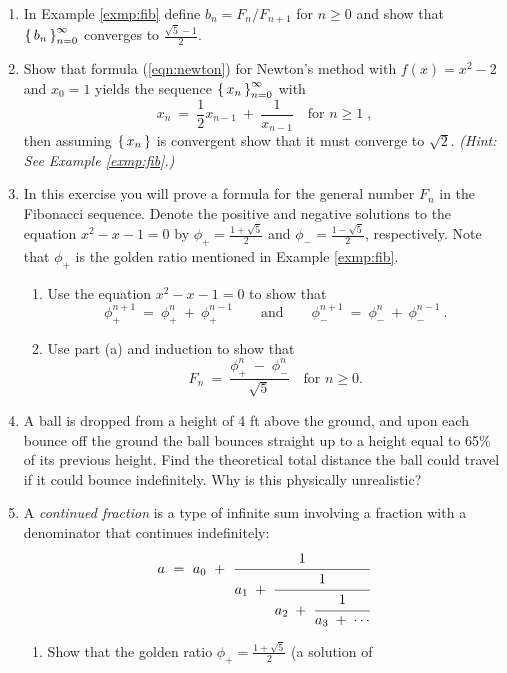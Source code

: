 {\begin{enumerate}[\bfseries 1.]
[{[\bfseries 1.]}]
 \item In Example \ref{exmp:fib} define $b_n = F_n/F_{n+1}$ for $n\ge 0$ and
 show that $\left\lbrace\mspace{3mu}b_n\mspace{3mu}\right\rbrace_{n=0}^{\infty}$ converges to $\frac{\sqrt{5}-1}{2}$.
 \item Show that formula (\ref{eqn:newton}) for Newton's method with
 $f(x) = x^2 - 2$ and $x_0 = 1$ yields the sequence $\left\lbrace\mspace{3mu}x_n\mspace{3mu}\right\rbrace_{n=0}^{\infty}$
 with
\[
x_n ~=~ \frac{1}{2} x_{n-1} ~+~ \frac{1}{x_{n-1}} \quad\text{for $n\ge 1\;$,}
\]
then assuming $\left\lbrace\mspace{3mu}x_n\mspace{3mu}\right\rbrace$ is convergent show that it must converge to
$\sqrt{2}$. \emph{(Hint: See Example \ref{exmp:fib}.)}
 \item In this exercise you will prove a formula for the general number $F_n$
  in the Fibonacci sequence. Denote the positive and negative solutions to the
  equation $x^2 - x - 1 = 0$ by $\phi_{+} = \frac{1+\sqrt{5}}{2}$ and
  $\phi_{-} = \frac{1-\sqrt{5}}{2}$, respectively. Note that $\phi_{+}$ is the
  golden ratio mentioned in Example \ref{exmp:fib}.
\begin{enumerate}[\bfseries (a)]
 \item Use the equation $x^2 - x - 1 = 0$ to show that
\[
\phi_{+}^{n+1} ~=~ \phi_{+}^{n} ~+~ \phi_{+}^{n-1} \qquad\text{and}\qquad
\phi_{-}^{n+1} ~=~ \phi_{-}^{n} ~+~ \phi_{-}^{n-1} ~.
\]
 \item Use part (a) and induction to show that
\[
F_n ~=~ \frac{\phi_{+}^{n} \;-\; \phi_{-}^{n}}{\sqrt{5}} \quad\text{for $n\ge 0$.}
\]
\end{enumerate}
 \item A ball is dropped from a height of 4 ft above the ground, and upon
  each bounce off the ground the ball bounces straight up to a height equal to
  65\% of its previous height. Find the theoretical total distance the ball
  could travel if it could bounce indefinitely. Why is this physically
  unrealistic?
 \item A \emph{continued fraction} is a type of
  infinite sum involving a fraction with a denominator that continues
  indefinitely:
\[
a ~=~ a_0 ~+~ \cfrac{1}{a_1 \;+\; \cfrac{1}{a_2 \;+\; \cfrac{1}{a_3 \;+\; \cdots}}}
\]
\begin{enumerate}[\bfseries (a)]
 \item Show that the golden ratio $\phi_{+} = \frac{1+\sqrt{5}}{2}$ (a solution of

\end{enumerate}
\end{enumerate}}
